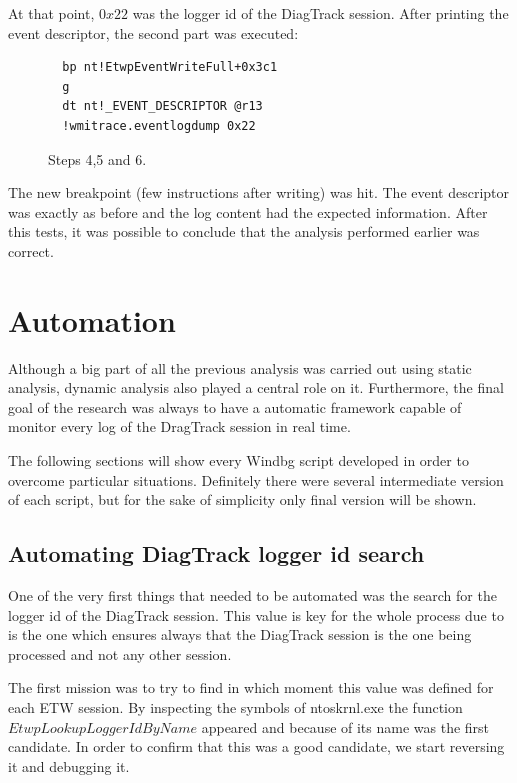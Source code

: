 At that point, $0x22$ was the logger id of the DiagTrack session. After printing the event descriptor, the second part was executed:

\begin{figure}[H]
\begin{lstlisting}  
  bp nt!EtwpEventWriteFull+0x3c1
  g
  dt nt!_EVENT_DESCRIPTOR @r13
  !wmitrace.eventlogdump 0x22
\end{lstlisting} 
\caption[]{Steps 4,5 and 6.}
\label{fig:powershell_cmd}
\end{figure}

The new breakpoint (few instructions after writing) was hit. The event descriptor was exactly as before and the log content had the expected information. 
After this tests, it was possible to conclude that the analysis performed earlier was correct.





\section{\bfseries Automation}
Although a big part of all the previous analysis was carried out using static analysis, dynamic analysis also played a central role on it. Furthermore, the final goal of the research was always to have a automatic framework capable of monitor every log of the DragTrack session in real time. 

The following sections will show every Windbg script developed in order to overcome particular situations. Definitely there were several intermediate version of each script, but for the sake of simplicity only final version will be shown.  


\subsection{\bfseries Automating DiagTrack logger id search}
One of the very first things that needed to be automated was the search for the logger id of the DiagTrack session. This value is key for the whole process due to is the one which ensures always that the DiagTrack session is the one being processed and not any other session. 

The first mission was to try to find in which moment this value was defined for each ETW session. By inspecting the symbols of ntoskrnl.exe the function $EtwpLookupLoggerIdByName$ appeared and because of its name was the first candidate. In order to confirm that this was a good candidate, we start reversing it and debugging it.  


